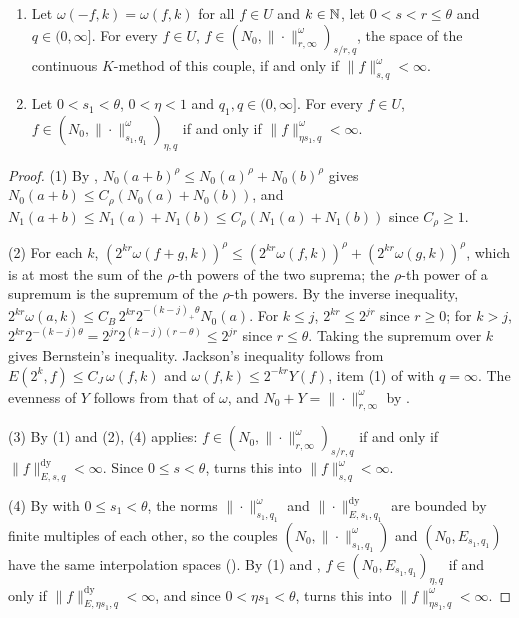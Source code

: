 \begin{corollary}
\begin{enumerate}
    $(N_0, \|\cdot\|^{\omega}_{r, \infty})$.
  \item Let $\omega(-f, k) = \omega(f, k)$ for all $f \in U$ and $k \in \mathbb{N}$, let
    $0 < s < r \leq \theta$ and $q \in (0, \infty]$. For every $f \in U$,
    $f \in (N_0, \|\cdot\|^{\omega}_{r, \infty})_{s/r, q}$, the space of the continuous
    $K$-method of this couple, if and only if $\|f\|^{\omega}_{s, q} < \infty$.
  \item Let $0 < s_1 < \theta$, $0 < \eta < 1$ and $q_1, q \in (0, \infty]$. For every $f \in U$,
    $f \in (N_0, \|\cdot\|^{\omega}_{s_1, q_1})_{\eta, q}$ if and only if
    $\|f\|^{\omega}_{\eta s_1, q} < \infty$.
\end{enumerate}
\end{corollary}

\begin{proof}
\leanok
{}
(1) By , $N_0(a + b)^\rho \leq N_0(a)^\rho + N_0(b)^\rho$ gives
$N_0(a + b) \leq C_\rho (N_0(a) + N_0(b))$, and
$N_1(a + b) \leq N_1(a) + N_1(b) \leq C_\rho (N_1(a) + N_1(b))$ since $C_\rho \geq 1$.

(2) For each $k$,
$(2^{kr} \omega(f + g, k))^\rho \leq (2^{kr} \omega(f, k))^\rho + (2^{kr} \omega(g, k))^\rho$,
which is at most the sum of the $\rho$-th powers of the two suprema; the $\rho$-th power of a
supremum is the supremum of the $\rho$-th powers. By the inverse inequality,
$2^{kr} \omega(a, k) \leq C_B \, 2^{kr} 2^{-(k - j)_+ \theta} N_0(a)$. For $k \leq j$,
$2^{kr} \leq 2^{jr}$ since $r \geq 0$; for $k > j$,
$2^{kr} 2^{-(k-j)\theta} = 2^{jr} 2^{(k - j)(r - \theta)} \leq 2^{jr}$ since $r \leq \theta$.
Taking the supremum over $k$ gives Bernstein's inequality. Jackson's inequality follows from
$E(2^k, f) \leq C_J \, \omega(f, k)$ and $\omega(f, k) \leq 2^{-kr} Y(f)$, item (1) of
 with $q = \infty$. The evenness of $Y$ follows from that of $\omega$,
and $N_0 + Y = \|\cdot\|^{\omega}_{r, \infty}$ by .

(3) By (1) and (2),  (4) applies:
$f \in (N_0, \|\cdot\|^{\omega}_{r, \infty})_{s/r, q}$ if and only if
$\|f\|^{\mathrm{dy}}_{E, s, q} < \infty$. Since $0 \leq s < \theta$,
 turns this into $\|f\|^{\omega}_{s, q} < \infty$.

(4) By  with $0 \leq s_1 < \theta$, the norms
$\|\cdot\|^{\omega}_{s_1, q_1}$ and $\|\cdot\|^{\mathrm{dy}}_{E, s_1, q_1}$ are bounded by
finite multiples of each other, so the couples $(N_0, \|\cdot\|^{\omega}_{s_1, q_1})$ and
$(N_0, E_{s_1, q_1})$ have the same interpolation spaces (). By
(1) and , $f \in (N_0, E_{s_1, q_1})_{\eta, q}$ if and only if
$\|f\|^{\mathrm{dy}}_{E, \eta s_1, q} < \infty$, and since $0 < \eta s_1 < \theta$,
 turns this into $\|f\|^{\omega}_{\eta s_1, q} < \infty$.
\end{proof}

